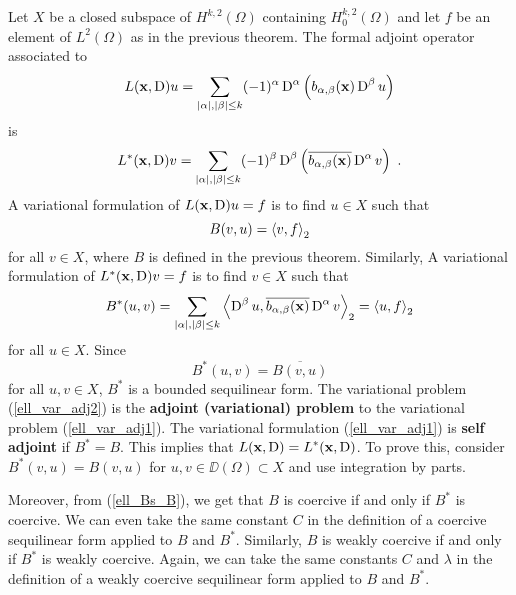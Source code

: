Let $X$ be a closed subspace of $\displaystyle H^{k,2}(\Omega)$ containing
$\displaystyle H^{k,2}_0(\Omega)$ and let $f$ be an element of
$\displaystyle L^2(\Omega)$ as in
the previous theorem.  The formal adjoint operator associated to
\[
L(\mathbf{x},\operatorname{D})u = \sum_{|\alpha|,|\beta|\leq k} (-1)^\alpha \operatorname{D}^\alpha
\left( b_{\alpha,\beta}(\mathbf{x}) \operatorname{D}^\beta u\right)
\]
is
\[
L^\ast(\mathbf{x},\operatorname{D})v = \sum_{|\alpha|,|\beta|\leq k} (-1)^\beta \operatorname{D}^\beta
\left( \overline{b_{\alpha,\beta}(\mathbf{x})} \operatorname{D}^\alpha v\right) \  .
\]
A variational formulation of $L(\mathbf{x},\operatorname{D})u = f$ is to find
$u\in X$ such that
\begin{equation} \label{ell_var_adj1}
B(v,u) = \left\langle{v} , {f}\right\rangle_2
\end{equation}
for all $v \in X$, where $B$ is defined in the previous theorem.  Similarly, A
variational formulation of $L^\ast(\mathbf{x},\operatorname{D})v = f$ is to find
$v\in X$ such that
\begin{equation} \label{ell_var_adj2}
B^\ast(u,v) = \sum_{|\alpha|,|\beta|\leq k} 
\left\langle{\operatorname{D}^\beta u} , {\overline{b_{\alpha,\beta}(\mathbf{x})} \operatorname{D}^\alpha v}\right\rangle_2
= \left\langle{u} , {f}\right\rangle_2
\end{equation}
for all $u \in X$.  Since
\begin{equation} \label{ell_Bs_B}
B^\ast(u,v) = \overline{B(v,u)}
\end{equation}
for all $u,v \in X$,
$\displaystyle B^\ast$ is a bounded sequilinear form. The variational problem
(\ref{ell_var_adj2}) is the {\bfseries adjoint (variational) problem}
to the variational problem (\ref{ell_var_adj1}).  The variational
formulation (\ref{ell_var_adj1}) is {\bfseries self adjoint}
 if
$\displaystyle B^\ast=B$.  This implies that
$\displaystyle L(\mathbf{x},\operatorname{D})=L^\ast(\mathbf{x},\operatorname{D})$.  To
prove this, consider $\displaystyle B^\ast(v,u) = B(v,u)$ for
$u,v \in \DD(\Omega) \subset X$ and use integration by parts.

Moreover, from (\ref{ell_Bs_B}), we get that $B$ is coercive
if and only if $\displaystyle B^\ast$ is coercive.  We can even take the same
constant $C$ in the definition of a coercive sequilinear form applied
to $B$ and $\displaystyle B^\ast$.  Similarly, $B$ is weakly coercive
if and only if $\displaystyle B^\ast$ is weakly coercive.  Again, we
can take the same constants $C$ and $\lambda$ in the definition of a
weakly coercive sequilinear form applied to $B$ and $\displaystyle B^\ast$.

